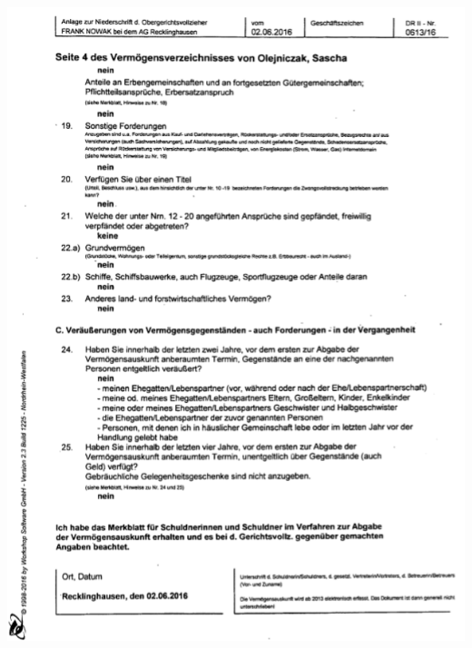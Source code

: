 \bigskip\noindent
\begin{minipage}{\textwidth}
  \centering
  \includegraphics{img/VVformular_teil4.PNG}
\end{minipage}


